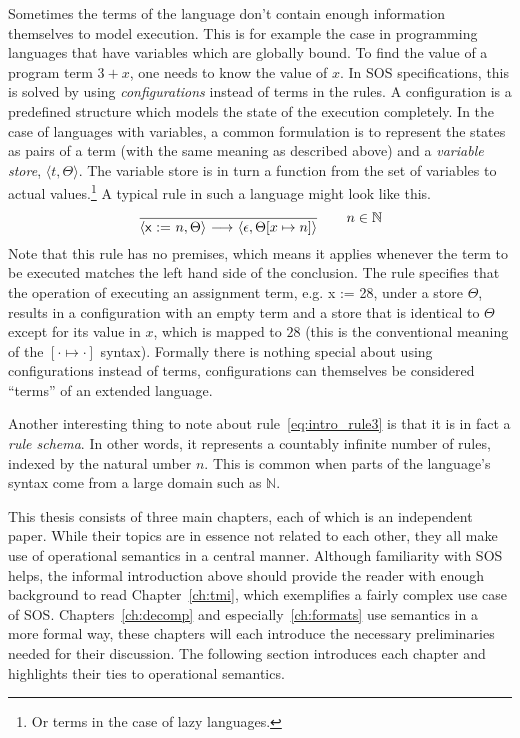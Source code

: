 \vspace{1em}

Sometimes the terms of the language don't contain enough information themselves
to model execution. This is for example the case in programming languages that have
variables which are globally bound. To find the value of a program term $3 + x$,
one needs to know the value of $x$. In SOS specifications, this is solved by using
\emph{configurations} instead of terms in the rules. A configuration is a predefined
structure which models the state of the execution completely. In the case of languages
with variables, a common formulation is to represent the states as pairs of a
term (with the same meaning as described above) and a \emph{variable store}, 
$\langle t, \Theta \rangle$. The variable store is in turn a function from the
set of variables to actual values.\footnote{Or terms in the case of lazy languages.}
A typical rule in such a language might look like this.
\begin{equation}\label{eq:intro_rule3}
    \frac{}{\langle \textsf{x := }n, \Theta\rangle \ {\stackrel{{}}{\longrightarrow}}\ 
            \langle \epsilon, \Theta[x\mapsto n]\rangle} \qquad n\in \mathbb{N}
\end{equation}
Note that this rule has no premises, which means it applies whenever the term
to be executed matches the left hand side of the conclusion.
The rule specifies that the operation of executing an assignment term, e.g.
\textsf{x := 28}, under a store $\Theta$, results in a configuration with an
empty term and a store that is identical to $\Theta$ except for its value in $x$,
which is mapped to $28$ (this is the conventional meaning of the $[\cdot\mapsto\cdot]$ syntax).
Formally there is nothing special about using configurations instead of terms,
configurations can themselves be considered ``terms'' of an extended language.

Another interesting thing to note about rule~\ref{eq:intro_rule3} is that it is
in fact a \emph{rule schema}. In other words, it represents a countably infinite
number of rules, indexed by the natural umber $n$. This is common when parts
of the language's syntax come from a large domain such as $\mathbb{N}$.

\vspace{1em}

This thesis consists of three main chapters, each of which is an independent paper.
While their topics are in essence not related to each other, they all make use of
operational semantics in a central manner. Although familiarity with SOS helps, the
informal introduction above should provide the reader with enough background to read
Chapter~\ref{ch:tmi}, which exemplifies a fairly complex use case of SOS. 
Chapters~\ref{ch:decomp} and especially~\ref{ch:formats} use semantics in a more
formal way, these chapters will each introduce the necessary preliminaries needed
for their discussion. The following section introduces each chapter and highlights
their ties to operational semantics.



